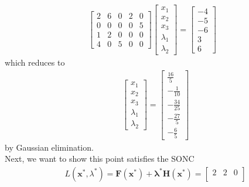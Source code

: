 \documentclass[10pt]{article}
\begin{document}
\begin{enumerate}
\begin{enumerate}
\begin{align*}
\begin{bmatrix}
                2 & 6 & 0 & 2 & 0\\
                0 & 0 & 0 & 0 & 5\\
                1 & 2 & 0 & 0 & 0\\
                4 & 0 & 5 & 0 & 0
            \end{bmatrix}\begin{bmatrix}
                x_1\\
                x_2\\
                x_3\\
                \lambda_1\\
                \lambda_2
            \end{bmatrix}=\begin{bmatrix}
                -4\\
                -5\\
                -6\\
                3\\
                6
            \end{bmatrix}
        \end{align*}
        which reduces to 
        \begin{align*}
            &\begin{bmatrix}
                x_1\\
                x_2\\
                x_3\\
                \lambda_1\\
                \lambda_2
            \end{bmatrix}=\begin{bmatrix}
                \frac{16}{5}\\
                -\frac{1}{10}\\
                -\frac{34}{25}\\
                -\frac{27}{5}\\
                -\frac{6}{5}
            \end{bmatrix}  
        \end{align*}
        by Gaussian elimination.\\
        Next, we want to show this point satisfies the SONC
        \begin{align*}
            &L(\mathbf{x}^*,\lambda^*)=\mathbf{F}(\mathbf{x}^*)+\mathbf{\lambda}^*\mathbf{H}(\mathbf{x}^*)
            =\begin{bmatrix}
                2 & 2 & 0\\

\end{bmatrix}
\end{align*}
\end{enumerate}
\end{enumerate}
\end{document}
